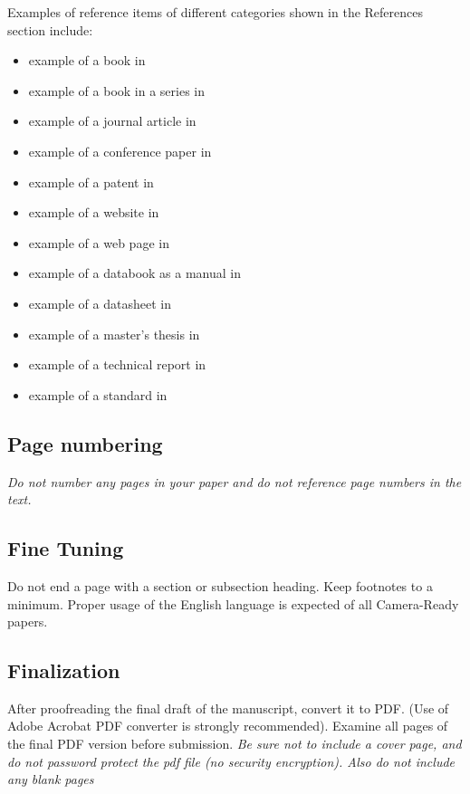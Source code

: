 \documentclass[conference]{csce}
\begin{document}
Examples of reference items of different categories shown in the
References section include:

\begin{itemize}
\item example of a book in \cite{IEEEexample:book}
\item example of a book in a series in \cite{IEEEexample:bookwithseriesvolume}
\item example of a journal article in \cite{IEEEexample:article_typical}
\item example of a conference paper in \cite{IEEEexample:confwithpaper}
\item example of a patent in \cite{IEEEexample:uspat}
\item example of a website in \cite{IEEEexample:IEEEwebsite}
\item example of a web page in \cite{IEEEexample:shellCTANpage}
\item example of a databook as a manual in \cite{IEEEexample:motmanual}
\item example of a datasheet in \cite{IEEEexample:datasheet}
\item example of a master's thesis in \cite{IEEEexample:masterstype}
\item example of a technical report in \cite{IEEEexample:techreptype}
\item example of a standard in \cite{IEEEexample:standard}
\end{itemize}

\subsection{Page numbering}
{\em Do not number any pages in your paper and do not reference page numbers in the text.}

\subsection{Fine Tuning}
Do not end a page with a section or subsection heading. Keep footnotes to a minimum. 
Proper usage of the English language is expected of all Camera-Ready papers.

\subsection{Finalization}
After proofreading the final draft of the manuscript, convert it to PDF.  (Use of 
Adobe Acrobat PDF converter is strongly recommended). Examine all pages of the 
final PDF version before submission. {\em Be sure not to include a cover page, and do 
not password protect the pdf file (no security encryption). Also do not include any blank pages}
\end{document}
